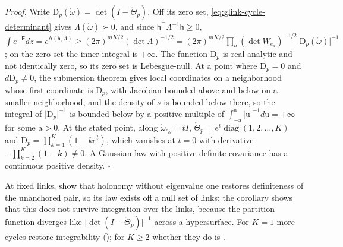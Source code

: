 \noindent\emph{Proof.}
Write \(\mathrm D_p(\mathring\omega)=\det(I-\mathring\Theta_p)\). Off its zero set,
\eqref{eq:glink-cycle-determinant} gives \(\Lambda(\mathring\omega)\succ0\), and since
\(\mathsf h^\top\Lambda^{-1}\mathsf h\geq0\),
\(\int e^{-\mathsf E}dz=e^{\mathsf A(\mathsf h,\Lambda)}\geq(2\pi)^{mK/2}(\det\Lambda)^{-1/2}
=(2\pi)^{mK/2}\prod_a(\det W_{e_a})^{-1/2}\lvert\mathrm D_p(\mathring\omega)\rvert^{-1}\); on the zero set
the inner integral is \(+\infty\). The function \(\mathrm D_p\) is real-analytic and not identically
zero, so its zero set is Lebesgue-null. At a point where \(\mathrm D_p=0\) and
\(d\mathrm D_p\neq0\), the submersion theorem gives local coordinates on a neighborhood whose first
coordinate is \(\mathrm D_p\), with Jacobian bounded above and below on a smaller neighborhood, and the
density of \(\nu\) is bounded below there, so the integral of \(\lvert\mathrm D_p\rvert^{-1}\) is bounded
below by a positive multiple of \(\int_{-\mathrm a}^{\mathrm a}\lvert\mathrm u\rvert^{-1}d\mathrm u=+\infty\) for some
\(\mathrm a>0\). At the stated point, along \(\mathring\omega_{e_0}=tI\),
\(\mathring\Theta_p=e^t\operatorname{diag}(1,2,\ldots,K)\) and \(\mathrm D_p=\prod_{k=1}^K(1-ke^t)\), which
vanishes at \(t=0\) with derivative \(-\prod_{k=2}^K(1-k)\neq0\). A Gaussian law with positive-definite
covariance has a continuous positive density. \hfill$\square$

At fixed links,  show that
holonomy without eigenvalue one restores definiteness of the unanchored pair, so its law exists off a
null set of links; the corollary shows that this does not survive integration over the links, because
the partition function diverges like \(\lvert\det(I-\mathring\Theta_p)\rvert^{-1}\) across a
hypersurface. For \(K=1\) more cycles restore integrability (); for
\(K\geq2\) whether they do is .

